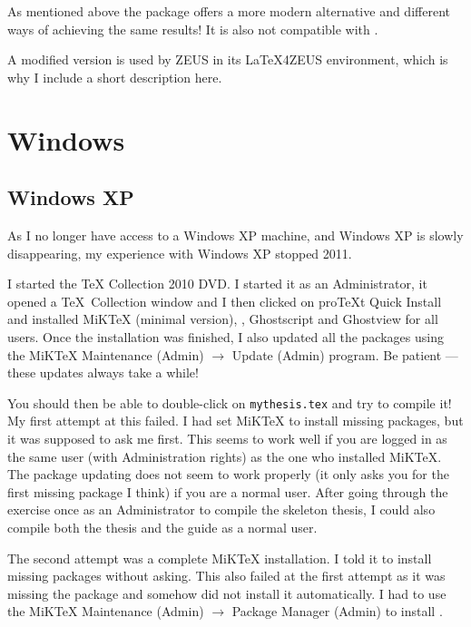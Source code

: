 As mentioned above the  package offers a
more modern alternative and different ways of achieving the same
results! It is also not compatible with .

A modified version  is used by ZEUS in its LaTeX4ZEUS
environment, which is why I include a short description here.

\section{Windows}%
\label{sec:app:old:windows}

\subsection{Windows XP}

As I no longer have access to a Windows XP machine, and Windows XP is
slowly disappearing, my experience with Windows XP stopped 2011.

I started the \TeX{} Collection 2010 DVD\@. I started it as an
Administrator, it opened a \TeX\ Collection window and I then clicked
on proTeXt Quick Install and installed MiK\TeX{} (minimal
version), \TeXnicCenter,
Ghostscript and Ghostview for all users. Once the installation was
finished, I also updated all the packages using the MiK\TeX{}
Maintenance (Admin) $\to$ Update (Admin) program. Be patient --- these
updates always take a while!

You should then be able to double-click on \texttt{mythesis.tex} and
try to compile it! My first attempt at this failed. I had set
MiK\TeX{} to install missing packages, but it was supposed to ask me
first. This seems to work well if you are logged in as the same user
(with Administration rights) as the one who installed MiK\TeX. The
package updating does not seem to work properly (it only asks you for
the first missing package I think) if you are a normal user. After
going through the exercise once as an Administrator to compile the
skeleton thesis, I could also compile both the thesis and the guide as
a normal user.

The second attempt was a complete MiK\TeX{} installation. I told it to
install missing packages without asking. This also failed at the first
attempt as it was missing the package  and somehow did
not install it automatically. I had to use the MiK\TeX{} Maintenance
(Admin) $\to$ Package Manager (Admin) to install .


